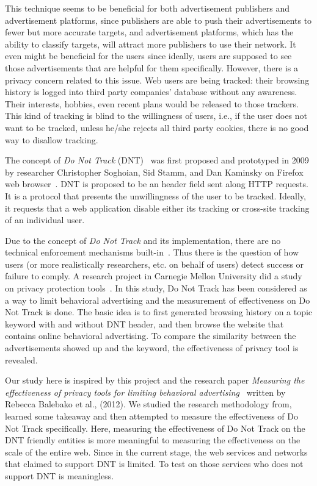 \documentclass{sig-alternate}
\begin{document}
This technique seems to be beneficial for both advertisement publishers and advertisement platforms, since publishers are able to push their advertisements to fewer but more accurate targets, and advertisement platforms, which has the ability to classify targets, will attract more publishers to use their network. It even might be beneficial for the users since ideally, users are supposed to see those advertisements that are helpful for them specifically. However, there is a privacy concern related to this issue. Web users are being tracked: their browsing history is logged into third party companies' database without any awareness. Their interests, hobbies, even recent plans would be released to those trackers. This kind of tracking is blind to the willingness of users, i.e., if the user does not want to be tracked, unless he/she rejects all third party cookies, there is no good way to disallow tracking.

The concept of \emph{Do Not Track} (DNT)~\cite{tschofenignot} was first proposed and prototyped in 2009 by researcher Christopher Soghoian, Sid Stamm, and Dan Kaminsky on Firefox web browser~\cite{wikidnt}. DNT is proposed to be an header field sent along HTTP requests. It is a protocol that presents the unwillingness of the user to be tracked. Ideally, it requests that a web application disable either its tracking or cross-site tracking of an individual user.

Due to the concept of \emph{Do Not Track} and its implementation, there are no technical enforcement mechanisms built-in~\cite{tschofenignot}. Thus there is the question of how users (or more realistically researchers, etc. on behalf of users) detect success or failure to comply. A research project in Carnegie Mellon University did a study on privacy protection tools~\cite{balebako2012measuring}. In this study, Do Not Track has been considered as a way to limit behavioral advertising and the measurement of effectiveness on Do Not Track is done. The basic idea is to first generated browsing history on a topic keyword with and without DNT header, and then browse the website that contains online behavioral advertising. To compare the similarity between the advertisements showed up and the keyword, the effectiveness of privacy tool is revealed.

Our study here is inspired by this project and the research paper \emph{Measuring the effectiveness of privacy tools for limiting behavioral advertising}~\cite{balebako2012measuring} written by Rebecca Balebako et al., (2012). We studied the research methodology from, learned some takeaway and then attempted to measure the effectiveness of Do Not Track specifically. Here, measuring the effectiveness of Do Not Track on the DNT friendly entities is more meaningful to measuring the effectiveness on the scale of the entire web. Since in the current stage, the web services and networks that claimed to support DNT is limited. To test on those services who does not support DNT is meaningless. 
\end{document}
